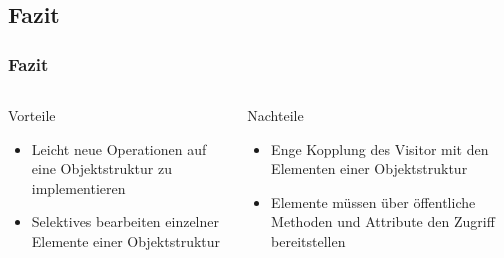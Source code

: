 \subsection{Fazit}
\begin{frame}
	\frametitle{Fazit}
	\begin{columns} 
    		\begin{exampleblock}{Vorteile}
    			\begin{itemize}
    				\item Leicht neue Operationen auf eine Objektstruktur zu implementieren
    				\item Selektives bearbeiten einzelner Elemente einer Objektstruktur
    			\end{itemize}
    		\end{exampleblock}
    		\begin{alertblock}{Nachteile}
    			\begin{itemize}
    				\item Enge Kopplung des Visitor mit den Elementen einer Objektstruktur
    				\item Elemente müssen über öffentliche Methoden und Attribute den Zugriff bereitstellen
    			\end{itemize}
    		\end{alertblock}
  	\end{columns}   	  		
\end{frame}